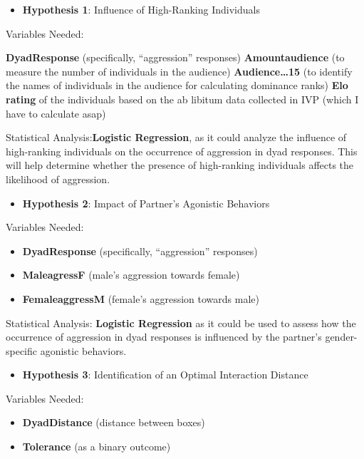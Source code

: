 \documentclass[
]{article}
\providecommand{\tightlist}{%
  \setlength{\itemsep}{0pt}\setlength{\parskip}{0pt}}
\begin{document}
\begin{itemize}
\tightlist
\item
  \textbf{Hypothesis 1}: Influence of High-Ranking Individuals
\end{itemize}

Variables Needed:

\textbf{DyadResponse} (specifically, ``aggression'' responses)
\textbf{Amountaudience} (to measure the number of individuals in the
audience) \textbf{Audience\ldots15} (to identify the names of
individuals in the audience for calculating dominance ranks) \textbf{Elo
rating} of the individuals based on the ab libitum data collected in IVP
(which I have to calculate asap)

Statistical Analysis:\textbf{Logistic Regression}, as it could analyze
the influence of high-ranking individuals on the occurrence of
aggression in dyad responses. This will help determine whether the
presence of high-ranking individuals affects the likelihood of
aggression.

\begin{itemize}
\tightlist
\item
  \textbf{Hypothesis 2}: Impact of Partner's Agonistic Behaviors
\end{itemize}

Variables Needed:

\begin{itemize}
\tightlist
\item
  \textbf{DyadResponse} (specifically, ``aggression'' responses)
\item
  \textbf{MaleagressF} (male's aggression towards female)
\item
  \textbf{FemaleaggressM} (female's aggression towards male)
\end{itemize}

Statistical Analysis: \textbf{Logistic Regression} as it could be used
to assess how the occurrence of aggression in dyad responses is
influenced by the partner's gender-specific agonistic behaviors.

\begin{itemize}
\tightlist
\item
  \textbf{Hypothesis 3}: Identification of an Optimal Interaction
  Distance
\end{itemize}

Variables Needed:

\begin{itemize}
\tightlist
\item
  \textbf{DyadDistance} (distance between boxes)
\item
  \textbf{Tolerance} (as a binary outcome)
\end{itemize}
\end{document}
